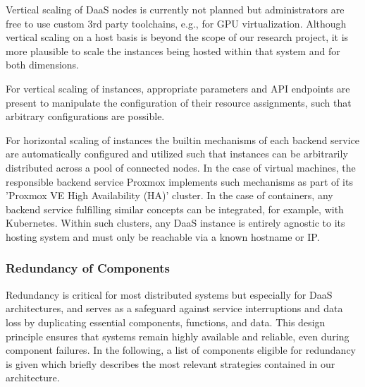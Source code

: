 \documentclass[runningheads]{llncs}
\begin{document}
Vertical scaling of DaaS nodes is currently not planned
but administrators are free to use custom 3rd party toolchains, e.g., for GPU virtualization.
Although vertical scaling on a host basis
is beyond the scope of our research project,
it is more plausible to scale the instances
being hosted within that system and for both dimensions.

For vertical scaling of instances, appropriate parameters and API endpoints are present
to manipulate the configuration of their resource assignments,
such that arbitrary configurations are possible.

For horizontal scaling of instances
the builtin mechanisms of each backend service are automatically configured and utilized
such that instances can be arbitrarily distributed across a pool of connected nodes.
In the case of virtual machines, the responsible backend service Proxmox implements
such mechanisms as part of its 'Proxmox VE High Availability (HA)' cluster.
In the case of containers, any backend service fulfilling
similar concepts can be integrated, for example, with Kubernetes.
Within such clusters, any DaaS instance is entirely agnostic to its hosting system
and must only be reachable via a known hostname or IP.

\subsubsection{Redundancy of Components}

Redundancy is critical for most distributed systems
but especially for DaaS architectures,
and serves as a safeguard against service interruptions and data loss
by duplicating essential components, functions, and data.
This design principle ensures that systems remain highly available and reliable,
even during component failures.
In the following, a list of components eligible for redundancy is given
which briefly describes the most relevant strategies contained in our architecture.
\end{document}
